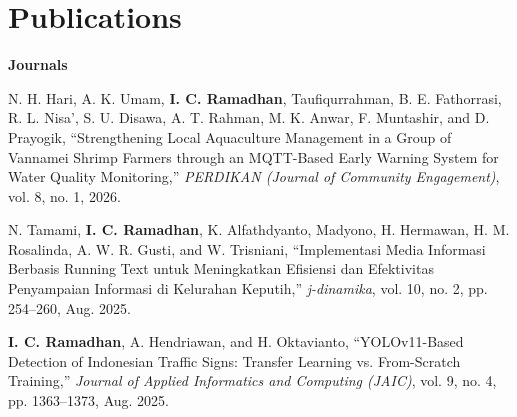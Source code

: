 \vspace{18pt}
\section{Publications}




\vspace{4pt}
\noindent\textbf{Journals}
\begin{enumerate}[label={[J\arabic*]}, leftmargin=2.8em]
  \item N. H. Hari, A. K. Umam, \textbf{I. C. Ramadhan}, Taufiqurrahman, B. E. Fathorrasi,
        R. L. Nisa', S. U. Disawa, A. T. Rahman, M. K. Anwar, F. Muntashir, and D. Prayogik,
        ``Strengthening Local Aquaculture Management in a Group of Vannamei Shrimp Farmers
        through an MQTT-Based Early Warning System for Water Quality Monitoring,''
        \textit{PERDIKAN (Journal of Community Engagement)}, vol. 8, no. 1, 2026.

  \item N. Tamami, \textbf{I. C. Ramadhan}, K. Alfathdyanto, Madyono, H. Hermawan,
        H. M. Rosalinda, A. W. R. Gusti, and W. Trisniani,
        ``Implementasi Media Informasi Berbasis Running Text untuk Meningkatkan
        Efisiensi dan Efektivitas Penyampaian Informasi di Kelurahan Keputih,''
        \textit{j-dinamika}, vol. 10, no. 2, pp. 254--260, Aug. 2025.

  \item \textbf{I. C. Ramadhan}, A. Hendriawan, and H. Oktavianto,
        ``YOLOv11-Based Detection of Indonesian Traffic Signs: Transfer Learning
        vs. From-Scratch Training,''
        \textit{Journal of Applied Informatics and Computing (JAIC)}, vol. 9,
        no. 4, pp. 1363--1373, Aug. 2025.
\end{enumerate}

